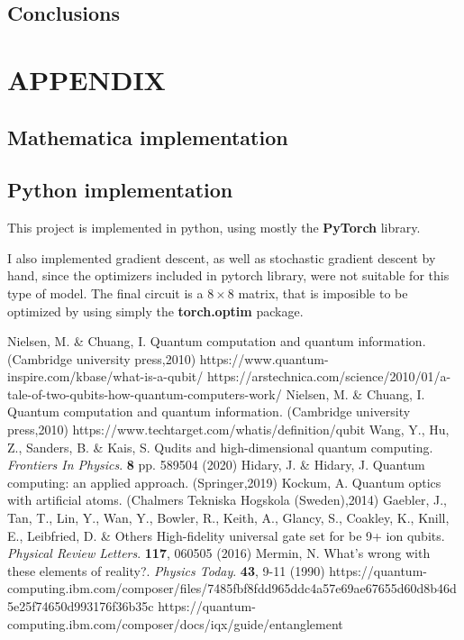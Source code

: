 \documentclass[inscr,ack,preface]{diphdthesis}
\begin{document}
\section{Conclusions}


\chapter{APPENDIX}
\section{Mathematica implementation}
\section{Python implementation}

This project is implemented in python, using mostly the \textbf{PyTorch} library. 


I also implemented gradient descent, as well as stochastic gradient descent by hand, since the optimizers included in pytorch library, were not suitable for this type of model. The final circuit is a $8\times8$ matrix, that is imposible to be optimized by using simply the \textbf{torch.optim} package.\\






\begin{thebibliography}{99}                                                                     
Nielsen, M. \& Chuang, I. Quantum computation and quantum information. (Cambridge university press,2010)
https://www.quantum-inspire.com/kbase/what-is-a-qubit/
https://arstechnica.com/science/2010/01/a-tale-of-two-qubits-how-quantum-computers-work/
Nielsen, M. \& Chuang, I. Quantum computation and quantum information. (Cambridge university press,2010)
https://www.techtarget.com/whatis/definition/qubit
Wang, Y., Hu, Z., Sanders, B. \& Kais, S. Qudits and high-dimensional quantum computing. {\em Frontiers In Physics}. \textbf{8} pp. 589504 (2020)
Hidary, J. \& Hidary, J. Quantum computing: an applied approach. (Springer,2019)
Kockum, A. Quantum optics with artificial atoms. (Chalmers Tekniska Hogskola (Sweden),2014)
Gaebler, J., Tan, T., Lin, Y., Wan, Y., Bowler, R., Keith, A., Glancy, S., Coakley, K., Knill, E., Leibfried, D. \& Others High-fidelity universal gate set for be 9+ ion qubits. {\em Physical Review Letters}. \textbf{117}, 060505 (2016)
Mermin, N. What's wrong with these elements of reality?. {\em Physics Today}. \textbf{43}, 9-11 (1990)
https://quantum-computing.ibm.com/composer/files/7485fbf8fdd965ddc4a57e69ae67655d60d8b46d5e25f74650d993176f36b35c
https://quantum-computing.ibm.com/composer/docs/iqx/guide/entanglement


\end{thebibliography}
\end{document}
